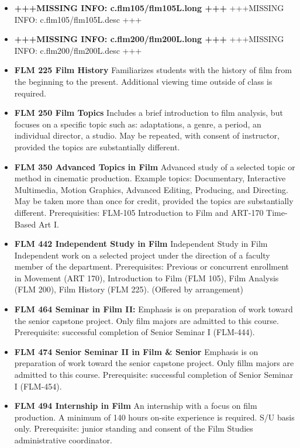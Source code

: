 \documentclass[
  letterpaper,
]{scrbook}
\providecommand{\tightlist}{%
  \setlength{\itemsep}{0pt}\setlength{\parskip}{0pt}}
\begin{document}
\begin{itemize}
\tightlist
\item
  \textbf{+++MISSING INFO: c.flm105/flm105L.long +++} +++MISSING INFO:
  c.flm105/flm105L.desc +++
\item
  \textbf{+++MISSING INFO: c.flm200/flm200L.long +++} +++MISSING INFO:
  c.flm200/flm200L.desc +++
\item
  \textbf{FLM 225 Film History} Familiarizes students with the history
  of film from the beginning to the present. Additional viewing time
  outside of class is required.
\item
  \textbf{FLM 250 Film Topics} Includes a brief introduction to film
  analysis, but focuses on a specific topic such as: adaptations, a
  genre, a period, an individual director, a studio. May be repeated,
  with consent of instructor, provided the topics are substantially
  different.
\item
  \textbf{FLM 350 Advanced Topics in Film} Advanced study of a selected
  topic or method in cinematic production. Example topics: Documentary,
  Interactive Multimedia, Motion Graphics, Advanced Editing, Producing,
  and Directing. May be taken more than once for credit, provided the
  topics are substantially different. Prerequisities: FLM-105
  Introduction to Film and ART-170 Time-Based Art I.
\item
  \textbf{FLM 442 Independent Study in Film} Independent Study in Film
  Independent work on a selected project under the direction of a
  faculty member of the department. Prerequisites: Previous or
  concurrent enrollment in Movement (ART 170), Introduction to Film (FLM
  105), Film Analysis (FLM 200), Film History (FLM 225). (Offered by
  arrangement)
\item
  \textbf{FLM 464 Seminar in Film II:} Emphasis is on preparation of
  work toward the senior capstone project. Only film majors are admitted
  to this course. Prerequisite: successful completion of Senior Seminar
  I (FLM-444).
\item
  \textbf{FLM 474 Senior Seminar II in Film \& Senior} Emphasis is on
  preparation of work toward the senior capstone project. Only fillm
  majors are admitted to this course. Prerequisite: successful
  completion of Senior Seminar I (FLM-454).
\item
  \textbf{FLM 494 Internship in Film} An internship with a focus on film
  production. A minimum of 140 hours on-site experience is required. S/U
  basis only. Prerequisite: junior standing and consent of the Film
  Studies administrative coordinator.
\end{itemize}
\end{document}
